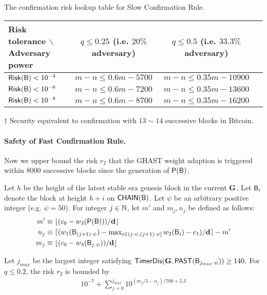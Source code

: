 \begin{center}	
	\begin{threeparttable}
		\caption{The confirmation risk lookup table for Slow Confirmation Rule.}			
		\begin{tabular}{l|ccc}
			\toprule
			Risk tolerance $\backslash$ Adversary power &  $q\le 0.25$ (i.e. $20\%$ adversary) & $q\le 0.5$ (i.e. $33.3\%$ adversary)&  \\
			\midrule
			$\mathsf{Risk}(\textsf{B})<10^{-4}$ & $m-n\le 0.6m-5700$\tnote{$\dagger$} & $m-n\le 0.35m-10900$ \\
			$\mathsf{Risk}(\textsf{B})<10^{-6}$& $m-n\le 0.6m-7200$ & $m-n\le 0.35m-13600$ \\
			$\mathsf{Risk}(\textsf{B})<10^{-8}$ & $m-n\le 0.6m-8700$ & $m-n\le 0.35m-16200$ \\
			\bottomrule
		\end{tabular}
		\begin{tablenotes}
			\item[$\dagger$] Security equivalent to confirmation with $13\sim 14$ successive blocks in Bitcoin.
		\end{tablenotes}
	\end{threeparttable}
\end{center}	


\paragraph{Safety of Fast Confirmation Rule.}

Now we upper bound the risk $r_2$ that
the GHAST weight adaption is triggered within $8000$ successive blocks since the generation of $\mathsf{P}{\left({\textsf{B}} \right)}$.

Let $h$ be the height of the latest stable era genesis block in the current \tg $\textbf{G}$. 
Let $\textsf{B}_i$ denote the block at height $h+i$ on $\mathsf{CHAIN}(\textsf{B})$. 
Let $\psi$ be an arbitrary positive integer (e.g. $\psi=50$).
% 
For integer $j\in\mathbb{N}$, let $m'$ and $m_j,n_j$ be defined as follows: 
\begin{align}
	m' &\equiv \lfloor (c_0-w_3(\mathsf{P}{\left({\textsf{B}} \right)}))/\mathbf{d}\rfloor\\
	n_j &\equiv \lceil(w_1(\textsf{B}_{(j+1)\cdot \psi})-\max\nolimits_{i\in(j\cdot \psi,(j+1)\cdot \psi]}w_2(\textsf{B}_i)-c_1)/\mathbf{d}\rceil-m'\\ 
	m_j &\equiv \lfloor(c_0-w_3(\textsf{B}_{j\cdot \psi}))/\mathbf{d}\rfloor\;
\end{align}

Let $j_{max}$ be the largest integer satisfying $\mathsf{TimerDis}(\textbf{G},\mathsf{PAST}(\textsf{B}_{j_{max}\cdot \psi}))\ge 140$. 
For $q\le 0.2$, the risk $r_2$ is bounded by 
%
\begin{align}
	10^{-7}+\sum_{j=0}^{j_{max}} 10^{(m_j/3-n_j)/700+5.3}
\end{align}